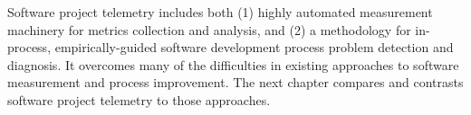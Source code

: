 Software project telemetry includes both (1) highly automated measurement machinery for metrics collection and analysis, and (2) a methodology for in-process, empirically-guided software development process problem detection and diagnosis. It overcomes many of the difficulties in existing approaches to software measurement and process improvement. The next chapter compares and contrasts software project telemetry to those approaches.







%
%
%
%
%
%

